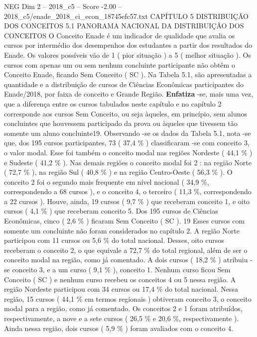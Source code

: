 \begin{textsample}{NEG Dim 2 – 2018\_c5 – Score -2.00 – 2018\_c5/enade\_2018\_ci\_econ\_18745efc57.txt}  \label{ex:f2_neg_111}
CAPÍTULO 5 DISTRIBUIÇÃO DOS CONCEITOS 5.1 PANORAMA NACIONAL DA DISTRIBUIÇÃO DOS CONCEITOS O Conceito Enade é um indicador de qualidade que avalia os cursos por intermédio dos desempenhos dos estudantes a partir dos resultados do Enade.
Os valores possíveis vão de 1 ( pior situação ) a 5 ( melhor situação ).
Os cursos com apenas um ou sem nenhum concluinte participante não obtêm o Conceito Enade, ficando Sem Conceito ( SC ).
Na Tabela 5.1, são apresentadas a quantidade e a distribuição de cursos de Ciências Econômicas participantes do Enade/2018, por faixa de conceito e Grande Região. \textbf{Enfatiza} -se, mais uma vez, que a diferença entre os cursos tabulados neste capítulo e no capítulo 2 corresponde aos cursos Sem Conceito, ou seja àqueles, em princípio, sem alunos concluintes que houvessem participado da prova ou àqueles que tivessem tão somente um aluno concluinte19.
Observando -se os dados da Tabela 5.1, nota -se que, dos 195 cursos participantes, 73 ( 37,4 \% ) classificaram -se com conceito 3, o valor modal.
Esse foi também o conceito modal nas regiões Nordeste ( 44,1 \% ) e Sudeste ( 41,2 \% ).
Nas demais regiões o conceito modal foi 2 : na região Norte ( 72,7 \% ), na região Sul ( 40,8 \% ) e na região Centro-Oeste ( 56,3 \% ).
O conceito 2 foi o segundo mais frequente em nível nacional ( 34,9 \%, correspondendo a 68 cursos ), e o conceito 4, o terceiro ( 11,3 \%, correspondendo a 22 cursos ).
Houve, ainda, 19 cursos ( 9,7 \% ) que receberam conceito 1, e oito cursos ( 4,1 \% ) que receberam conceito 5.
Dos 195 cursos de Ciências Econômicas, cinco ( 2,6 \% ) ficaram Sem Conceito ( SC ). 19 Esses cursos com somente um concluinte não foram considerados no capítulo 2.
A região Norte participou com 11 cursos ou 5,6 \% do total nacional.
Desses, oito cursos receberam o conceito 2, o que equivale a 72,7 \% do total regional, além de ser o conceito modal na região, como já comentado.
A dois cursos ( 18,2 \% ) atribuiu -se conceito 3, e a um curso ( 9,1 \% ), conceito 1.
Nenhum curso ficou Sem Conceito ( SC ) e nenhum curso recebeu os conceitos 4 ou 5 nessa região.
A região Nordeste participou com 34 cursos ou 17,4 \% do total nacional.
Nessa região, 15 cursos ( 44,1 \% em termos regionais ) obtiveram conceito 3, o conceito modal para a região, como já comentado.
Os conceitos 2 e 1 foram atribuídos, respectivamente, a nove e a sete cursos ( 26,5 \% e 20,6 \%, respectivamente ).
Ainda nessa região, dois cursos ( 5,9 \% ) foram avaliados com o conceito 4.

\end{textsample}
